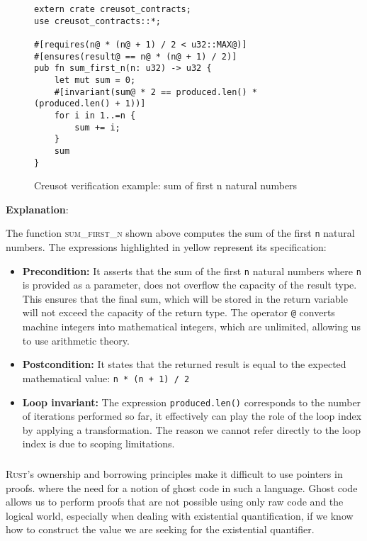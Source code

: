 \documentclass[11pt,a4paper]{article}
\begin{document}
\begin{figure}[h]
\centering
\begin{minipage}{0.95\linewidth}
\begin{verbatim}
extern crate creusot_contracts;
use creusot_contracts::*;

#[requires(n@ * (n@ + 1) / 2 < u32::MAX@)]
#[ensures(result@ == n@ * (n@ + 1) / 2)]
pub fn sum_first_n(n: u32) -> u32 {
    let mut sum = 0;
    #[invariant(sum@ * 2 == produced.len() * (produced.len() + 1))]
    for i in 1..=n {
        sum += i;
    }
    sum
}
\end{verbatim}
\caption{Creusot verification example: sum of first n natural numbers}
\label{fig:sum-example}
\end{minipage}
\end{figure}

\textbf{Explanation}: 

The function \textsc{sum\_first\_n} shown above computes the sum of the first \texttt{n} natural numbers. The expressions highlighted in yellow represent its specification:
\begin{itemize}
\item \textbf{Precondition:} It asserts that the sum of the first \texttt{n} natural numbers where \texttt{n} is provided as a parameter, does not overflow the capacity of the result type. This ensures that the final sum, which will be stored in the return variable will not exceed the capacity of the return type. The operator \texttt{@} converts machine integers into mathematical integers, which are unlimited, allowing us to use arithmetic theory.
\item \textbf{Postcondition:} It states that the returned result is equal to the expected mathematical value: \texttt{n * (n + 1) / 2}
\item \textbf{Loop invariant:} The expression \texttt{produced.len()} corresponds to the number of iterations performed so far, it effectively can play the role of the loop index by applying a transformation. The reason we cannot refer directly to the loop index is due to scoping limitations.
\end{itemize}
\subsubsection{}
\textsc{Rust}'s ownership and borrowing principles make it difficult to use pointers in proofs. where the need for a notion of ghost code in such a language. Ghost code allows us to perform proofs that are not possible using only raw code and the logical world, especially when dealing with existential quantification, if we know how to construct the value we are seeking for the existential quantifier.
\end{document}
